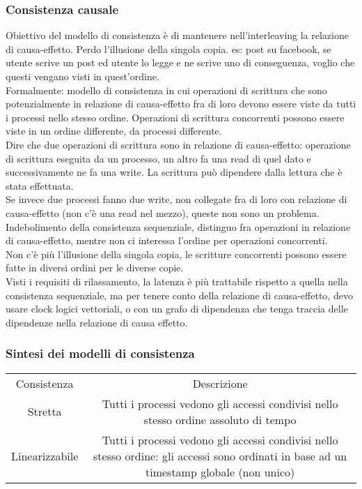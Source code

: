 \documentclass{article}
\begin{document}
\subsubsection{Consistenza causale}
Obiettivo del modello di consistenza è di mantenere nell'interleaving la relazione di causa-effetto. Perdo l'illusione della singola copia. es: post su facebook, se utente scrive un post ed utente lo legge e ne scrive uno di conseguenza, voglio che questi vengano visti in quest'ordine.\\ Formalmente: modello di consistenza in cui operazioni di scrittura che sono potenzialmente in relazione di causa-effetto fra di loro devono essere viste da tutti i processi nello stesso ordine. Operazioni di scrittura concorrenti possono essere viste in un ordine differente, da processi differente.\\ Dire che due operazioni di scrittura sono in relazione di causa-effetto: operazione di scrittura eseguita da un processo, un altro fa una read di quel dato e successivamente ne fa una write. La scrittura può dipendere dalla lettura che è stata effettuata.\\ Se invece due processi fanno due write, non collegate fra di loro con relazione di causa-effetto (non c'è una read nel mezzo), queste non sono un problema.\\ Indebolimento della consistenza sequenziale, distinguo fra operazioni in relazione di causa-effetto, mentre non ci interessa l'ordine per operazioni concorrenti.\\ Non c'è più l'illusione della singola copia, le scritture concorrenti possono essere fatte in diversi ordini per le diverse copie.\\ Visti i requisiti di rilassamento, la latenza è più trattabile rispetto a quella nella consistenza sequenziale, ma per tenere conto della relazione di causa-effetto, devo usare clock logici vettoriali, o con un grafo di dipendenza che tenga traccia delle dipendenze nella relazione di causa effetto.
\subsubsection{Sintesi dei modelli di consistenza}
\begin{table}
\begin{tabular}{ c c }
Consistenza & Descrizione\\
Stretta & Tutti i processi vedono gli accessi condivisi nello stesso ordine assoluto di tempo\\
Linearizzabile & Tutti i processi vedono gli accessi condivisi nello stesso ordine: gli accessi sono ordinati in base ad un timestamp globale (non unico)
\end{tabular}
\end{table}
\end{document}
